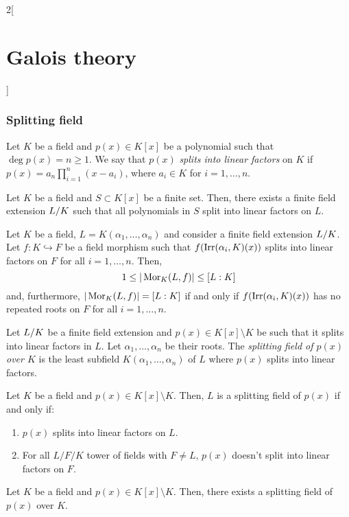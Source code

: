 \documentclass[../../../main.tex]{subfiles}
\begin{document}
\begin{multicols}{2}[\section{Galois theory}]
  \subsubsection{Splitting field}
  \begin{definition}
    Let $K$ be a field and $p(x)\in K[x]$ be a polynomial such that $\deg p(x)=n\geq 1$. We say that $p(x)$ \textit{splits into linear factors} on $K$ if $p(x)=a_n\prod_{i=1}^n(x-a_i)$, where $a_i\in K$ for $i=1,\ldots,n$.
  \end{definition}
  \begin{theorem}
    Let $K$ be a field and $S\subset K[x]$ be a finite set. Then, there exists a finite field extension $\quot{L}{K}$ such that all polynomials in $S$ split into linear factors on $L$.
  \end{theorem}
  \begin{theorem}
    Let $K$ be a field, $L=K(\alpha_1,\ldots,\alpha_n)$ and consider a finite field extension $\quot{L}{K}$. Let $f:K\hookrightarrow F$ be a field morphism such that $f(\operatorname{Irr}(\alpha_i,K)(x))$ splits into linear factors on $F$ for all $i=1,\ldots,n$. Then, $$1\leq|\operatorname{Mor}_K(L,f)|\leq [L:K]$$ and, furthermore, $|\operatorname{Mor}_K(L,f)|=[L:K]$ if and only if $f(\operatorname{Irr}(\alpha_i,K)(x))$ has no repeated roots on $F$ for all $i=1,\ldots,n$.
  \end{theorem}
  \begin{definition}
    Let $\quot{L}{K}$ be a finite field extension and $p(x)\in K[x]\setminus K$ be such that it splits into linear factors in $L$. Let $\alpha_1,\ldots,\alpha_n$ be their roots. The \textit{splitting field of $p(x)$ over $K$} is the least subfield $K(\alpha_1,\ldots,\alpha_n)$ of $L$ where $p(x)$ splits into linear factors.
  \end{definition}
  \begin{prop}
    Let $K$ be a field and $p(x)\in K[x]\setminus K$. Then, $L$ is a splitting field of $p(x)$ if and only if:
    \begin{enumerate}
      \item $p(x)$ splits into linear factors on $L$.
      \item For all $L/F/K$ tower of fields with $F\ne L$, $p(x)$ doesn't split into linear factors on $F$.
    \end{enumerate}
  \end{prop}
  \begin{theorem}
    Let $K$ be a field and $p(x)\in K[x]\setminus K$. Then, there exists a splitting field of $p(x)$ over $K$.

\end{theorem}
\end{multicols}
\end{document}

